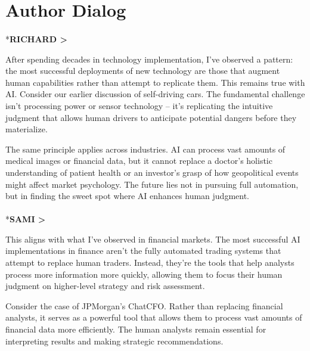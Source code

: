 \documentclass[
  Letterpaper,
]{scrbook}
\makeatletter
\let\oldparagraph\paragraph
\renewcommand{\paragraph}{
    \@ifstar
      \xxxParagraphStar
      \xxxParagraphNoStar
  }
\newcommand{\xxxParagraphStar}[1]{\oldparagraph*{#1}\mbox{}}
\newcommand{\xxxParagraphNoStar}[1]{\oldparagraph{#1}\mbox{}}
\makeatother
\begin{document}
\section*{Author Dialog}\label{author-dialog}


\paragraph*{\texorpdfstring{\textbf{RICHARD
\textgreater{}}}{RICHARD \textgreater{}}}\label{richard}

After spending decades in technology implementation, I've observed a
pattern: the most successful deployments of new technology are those
that augment human capabilities rather than attempt to replicate them.
This remains true with AI. Consider our earlier discussion of
self-driving cars. The fundamental challenge isn't processing power or
sensor technology -- it's replicating the intuitive judgment that allows
human drivers to anticipate potential dangers before they materialize.

The same principle applies across industries. AI can process vast
amounts of medical images or financial data, but it cannot replace a
doctor's holistic understanding of patient health or an investor's grasp
of how geopolitical events might affect market psychology. The future
lies not in pursuing full automation, but in finding the sweet spot
where AI enhances human judgment.

\paragraph*{\texorpdfstring{\textbf{SAMI
\textgreater{}}}{SAMI \textgreater{}}}\label{sami}

This aligns with what I've observed in financial markets. The most
successful AI implementations in finance aren't the fully automated
trading systems that attempt to replace human traders. Instead, they're
the tools that help analysts process more information more quickly,
allowing them to focus their human judgment on higher-level strategy and
risk assessment.

Consider the case of JPMorgan's ChatCFO. Rather than replacing financial
analysts, it serves as a powerful tool that allows them to process vast
amounts of financial data more efficiently. The human analysts remain
essential for interpreting results and making strategic recommendations.
\end{document}
